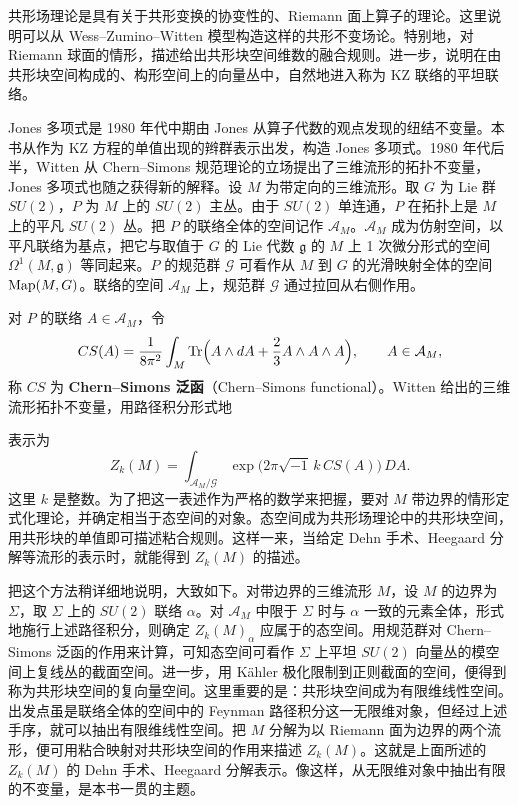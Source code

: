 共形场理论是具有关于共形变换的协变性的、Riemann 面上算子的理论。这里说明可以从 Wess--Zumino--Witten 模型构造这样的共形不变场论。特别地，对 Riemann 球面的情形，描述给出共形块空间维数的融合规则。进一步，说明在由共形块空间构成的、构形空间上的向量丛中，自然地进入称为 KZ 联络的平坦联络。

Jones 多项式是 1980 年代中期由 Jones 从算子代数的观点发现的纽结不变量。本书从作为 KZ 方程的单值出现的辫群表示出发，构造 Jones 多项式。1980 年代后半，Witten 从 Chern--Simons 规范理论的立场提出了三维流形的拓扑不变量，Jones 多项式也随之获得新的解释。设 $M$ 为带定向的三维流形。取 $G$ 为 Lie 群 $SU(2)$，$P$ 为 $M$ 上的 $SU(2)$ 主丛。由于 $SU(2)$ 单连通，$P$ 在拓扑上是 $M$ 上的平凡 $SU(2)$ 丛。把 $P$ 的联络全体的空间记作 $\mathcal{A}_M$。$\mathcal{A}_M$ 成为仿射空间，以平凡联络为基点，把它与取值于 $G$ 的 Lie 代数 $\mathfrak{g}$ 的 $M$ 上 1 次微分形式的空间 $\Omega^{1}(M,\mathfrak{g})$ 等同起来。$P$ 的规范群 $\mathcal{G}$ 可看作从 $M$ 到 $G$ 的光滑映射全体的空间 $\operatorname{Map}(M,G)$。联络的空间 $\mathcal{A}_M$ 上，规范群 $\mathcal{G}$ 通过拉回从右侧作用。

对 $P$ 的联络 $A\in\mathcal{A}_M$，令
\[
  CS(A)=\frac{1}{8\pi^{2}}\int_M \operatorname{Tr}\Bigl(A\wedge dA+\frac{2}{3}A\wedge A\wedge A\Bigr),
  \qquad A\in\mathcal{A}_M,
\]
称 $CS$ 为 \textbf{Chern--Simons 泛函}（Chern--Simons functional）。Witten 给出的三维流形拓扑不变量，用路径积分形式地

表示为
\[
  Z_k(M)=\int_{\mathcal{A}_M/\mathcal{G}} \exp\bigl(2\pi\sqrt{-1}\,k\,CS(A)\bigr)\,DA .
\]
这里 $k$ 是整数。为了把这一表述作为严格的数学来把握，要对 $M$ 带边界的情形定式化理论，并确定相当于态空间的对象。态空间成为共形场理论中的共形块空间，用共形块的单值即可描述粘合规则。这样一来，当给定 Dehn 手术、Heegaard 分解等流形的表示时，就能得到 $Z_k(M)$ 的描述。

把这个方法稍详细地说明，大致如下。对带边界的三维流形 $M$，设 $M$ 的边界为 $\Sigma$，取 $\Sigma$ 上的 $SU(2)$ 联络 $\alpha$。对 $\mathcal{A}_M$ 中限于 $\Sigma$ 时与 $\alpha$ 一致的元素全体，形式地施行上述路径积分，则确定 $Z_k(M)_{\alpha}$ 应属于的态空间。用规范群对 Chern--Simons 泛函的作用来计算，可知态空间可看作 $\Sigma$ 上平坦 $SU(2)$ 向量丛的模空间上复线丛的截面空间。进一步，用 Kähler 极化限制到正则截面的空间，便得到称为共形块空间的复向量空间。这里重要的是：共形块空间成为有限维线性空间。出发点虽是联络全体的空间中的 Feynman 路径积分这一无限维对象，但经过上述手序，就可以抽出有限维线性空间。把 $M$ 分解为以 Riemann 面为边界的两个流形，便可用粘合映射对共形块空间的作用来描述 $Z_k(M)$。这就是上面所述的 $Z_k(M)$ 的 Dehn 手术、Heegaard 分解表示。像这样，从无限维对象中抽出有限的不变量，是本书一贯的主题。

